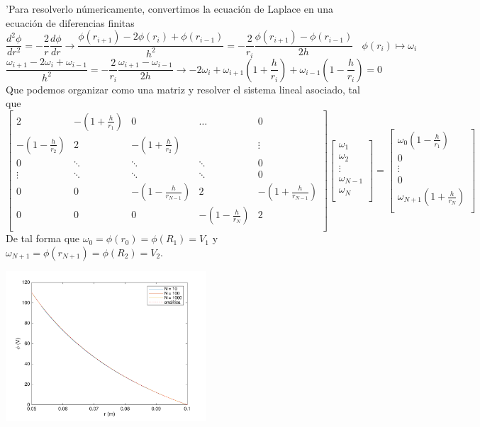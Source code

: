\documentclass{article}
\begin{document}
\noindent 'Para resolverlo númericamente, convertimos la ecuación de Laplace en una ecuación de diferencias finitas
\[\frac{d^2 \phi}{dr^2} = -\frac{2}{r} \frac{d \phi}{d r} \rightarrow \frac{\phi(r_{i+1})-2\phi(r_i)+\phi(r_{i-1})}{h^2} = -\frac{2}{r_i} \frac{\phi(r_{i+1})-\phi(r_{i-1})}{2h} \ \ \ \ \phi(r_i)\mapsto \omega_i\]
\[\frac{\omega_{i+1}-2\omega_{i}+\omega_{i-1}}{h^2} = -\frac{2}{r_i} \frac{\omega_{i+1}-\omega_{i-1}}{2h}\rightarrow -2\omega_{i}+\omega_{i+1}\left(1+\frac{h}{r_i}\right)+\omega_{i-1}\left(1-\frac{h}{r_i}\right) = 0\]
Que podemos organizar como una matriz y resolver el sistema lineal asociado, tal que
\[\left[\begin{matrix}
	2 & -\left(1+\frac{h}{r_1}\right) & 0 & \hdots & 0 \\
	-\left(1-\frac{h}{r_2}\right) & 2 & -\left(1+\frac{h}{r_2}\right) & & \vdots \\
	0 & \ddots & \ddots & \ddots & 0\\
	\vdots & \ddots & \ddots & \ddots & 0\\
	0 & 0 & -\left(1-\frac{h}{r_{N-1}}\right) & 2 & -\left(1+\frac{h}{r_{N-1}}\right) \\
	0 & 0 & 0 & -\left(1-\frac{h}{r_N}\right) & 2 \\
\end{matrix}\right]\left[\begin{matrix}
	\omega_1 \\
	\omega_2 \\
	\vdots \\
	\omega_{N-1}\\
	\omega_N \\
\end{matrix}\right] = \left[\begin{matrix}
	\omega_0\left(1-\frac{h}{r_1}\right) \\
	0 \\
	\vdots \\
	0\\
	\omega_{N+1}\left(1+\frac{h}{r_N}\right)\\
\end{matrix}\right]\]
De tal forma que $\omega_0 = \phi(r_0) = \phi(R_1) = V_1$ y  $\omega_{N+1} = \phi(r_{N+1}) = \phi(R_2) = V_2$.
\newpage
\begin{minipage}{8cm}
	\centering
	\includegraphics[width=7.5cm]{untitled1.png}
  \end{minipage}%
\end{document}
